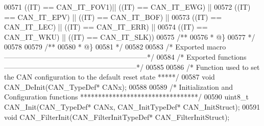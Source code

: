\begin{DoxyCode}
00571                              \textcolor{preprocessor}{(}\textcolor{preprocessor}{(}\textcolor{preprocessor}{IT}\textcolor{preprocessor}{)} \textcolor{preprocessor}{==} CAN_IT_FOV1\textcolor{preprocessor}{)}\textcolor{preprocessor}{||} \textcolor{preprocessor}{(}\textcolor{preprocessor}{(}\textcolor{preprocessor}{IT}\textcolor{preprocessor}{)} \textcolor{preprocessor}{==} CAN_IT_EWG\textcolor{preprocessor}{)}    \textcolor{preprocessor}{||}
00572                              \textcolor{preprocessor}{(}\textcolor{preprocessor}{(}\textcolor{preprocessor}{IT}\textcolor{preprocessor}{)} \textcolor{preprocessor}{==} CAN_IT_EPV\textcolor{preprocessor}{)} \textcolor{preprocessor}{||} \textcolor{preprocessor}{(}\textcolor{preprocessor}{(}\textcolor{preprocessor}{IT}\textcolor{preprocessor}{)} \textcolor{preprocessor}{==} CAN_IT_BOF\textcolor{preprocessor}{)}    \textcolor{preprocessor}{||}
00573                              \textcolor{preprocessor}{(}\textcolor{preprocessor}{(}\textcolor{preprocessor}{IT}\textcolor{preprocessor}{)} \textcolor{preprocessor}{==} CAN_IT_LEC\textcolor{preprocessor}{)} \textcolor{preprocessor}{||} \textcolor{preprocessor}{(}\textcolor{preprocessor}{(}\textcolor{preprocessor}{IT}\textcolor{preprocessor}{)} \textcolor{preprocessor}{==} CAN_IT_ERR\textcolor{preprocessor}{)}    \textcolor{preprocessor}{||}
00574                              \textcolor{preprocessor}{(}\textcolor{preprocessor}{(}\textcolor{preprocessor}{IT}\textcolor{preprocessor}{)} \textcolor{preprocessor}{==} CAN_IT_WKU\textcolor{preprocessor}{)} \textcolor{preprocessor}{||} \textcolor{preprocessor}{(}\textcolor{preprocessor}{(}\textcolor{preprocessor}{IT}\textcolor{preprocessor}{)} \textcolor{preprocessor}{==} CAN_IT_SLK\textcolor{preprocessor}{)}\textcolor{preprocessor}{)}
00575 \textcolor{comment}{/**}
00576 \textcolor{comment}{  * @\}}
00577 \textcolor{comment}{  */}
00578 
00579 \textcolor{comment}{/**}
00580 \textcolor{comment}{  * @\}}
00581 \textcolor{comment}{  */}
00582 
00583 \textcolor{comment}{/* Exported macro ------------------------------------------------------------*/}
00584 \textcolor{comment}{/* Exported functions --------------------------------------------------------*/}
00585 
00586 \textcolor{comment}{/*  Function used to set the CAN configuration to the default reset state *****/}
00587 \textcolor{keywordtype}{void} CAN_DeInit(CAN\_TypeDef* CANx);
00588 
00589 \textcolor{comment}{/* Initialization and Configuration functions *********************************/}
00590 uint8\_t CAN_Init(CAN\_TypeDef* CANx, CAN\_InitTypeDef* CAN\_InitStruct);
00591 \textcolor{keywordtype}{void} CAN_FilterInit(CAN\_FilterInitTypeDef* CAN\_FilterInitStruct);

\end{DoxyCode}
